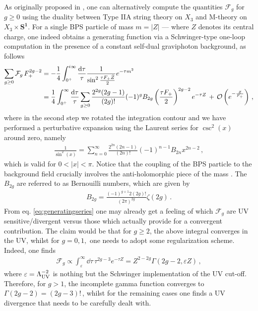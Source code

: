 As originally proposed in \cite{Gopakumar:1998ii,Gopakumar:1998jq}, one can alternatively compute the quantities $\mathcal{F}_g$ for $g\geq 0$ using the duality between Type IIA string theory on $X_3$ and M-theory on $X_3 \times \mathbf{S^1}$. For a single BPS particle of mass $m=|Z|$ --- where $Z$ denotes its central charge, one indeed obtains a generating function via a Schwinger-type one-loop computation in the presence of a constant self-dual graviphoton background, as follows
%
\begin{align}
\label{eq:generatingseries}
	\notag \sum_{g\geq 0}\mathcal{F}_g\, F_+^{2g-2} &= -\frac{1}{4} \int_{0^+}^{i \infty}\frac{{\rm d}\tau}{\tau} \frac{1}{\sin^2{\frac{\tau F_+ \bar Z}{2}}} e^{-\tau m^2}\\
    &= \frac{1}{4} \int_{0^+}^{\infty}\frac{{\rm d}\tau}{\tau} \sum_{g\geq0} \frac{2^{2g} (2g-1)}{(2g)!} (-1)^{g} B_{2g} \left( \frac{\tau F_+}{2}\right)^{2g-2} e^{-\tau Z}\, +\, \mathcal{O}\left(e^{-\frac{Z}{F_+}}\right)\, ,
\end{align}
%
where in the second step we rotated the integration contour %
and we have performed a perturbative expansion using the Laurent series for $\csc^2(x)$ around zero, namely
%
\begin{align}
	\frac{1}{\sin^{2}(x)} = \sum_{n=0}^{\infty} \frac{2^{2n}(2n-1)}{(2n)!} (-1)^{n-1} B_{2n} x^{2n-2}\, ,
\end{align}
%
which is valid for $0<|x|<\pi$. Notice that the coupling of the BPS particle to the background field crucially involves the anti-holomorphic piece of the mass \cite{Dedushenko:2014nya}. The $B_{2g}$ are referred to as Bernouilli numbers, which are given by
%
\begin{align}\label{eq:bernouilli}
	B_{2g}= \frac{(-1)^{g+1} 2 (2g)!}{(2\pi)^{2g}} \zeta(2g)\, .
\end{align}
%
From eq. \eqref{eq:generatingseries} one may already get a feeling of which $\mathcal{F}_g$ are UV sensitive/divergent versus those which actually provide for a convergent contribution. The claim would be that for $g\geq2$, the above integral converges in the UV, whilst for $g=0,1,$ one needs to adopt some regularization scheme. Indeed, one finds
%
\begin{align}
\label{eq:divergence}
	\mathcal{F}_g \propto \int_{\varepsilon}^{\infty} \dd\tau\, \tau^{2g-3}e^{-\tau Z} = Z^{2-2g} \Gamma(2g-2, \varepsilon Z)\, ,
\end{align}
%
where $\varepsilon=\Lambda_{\rm UV}^{-2}$ is nothing but the Schwinger implementation of the UV cut-off. Therefore, for $g > 1$, the incomplete gamma function converges to $\Gamma(2g-2) = (2g-3)!\,$, whilst for the remaining cases one finds a UV divergence that needs to be carefully dealt with.

